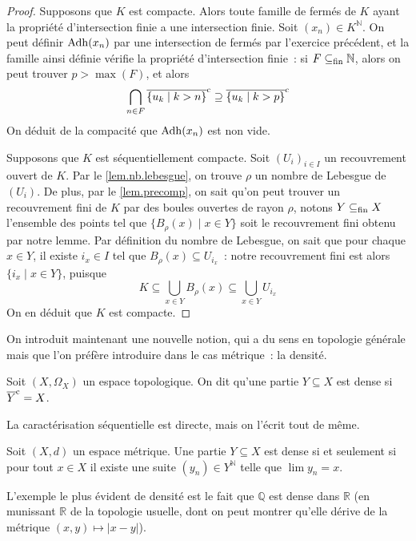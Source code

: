 \begin{proof}
  Supposons que $K$ est compacte. Alors toute famille de fermés de $K$ ayant
  la propriété d'intersection finie a une intersection finie. Soit
  $(x_n)\in K^{\mathbb N}$. On peut définir
  $\operatorname{Adh}(x_n)$ par une intersection de fermés par l'exercice précédent, et
  la famille ainsi définie vérifie la propriété d'intersection finie~: si
  $F\subseteq_{\mathrm{fin}} \mathbb N$, alors on peut trouver $p > \max(F)$, et alors
  \[\bigcap_{n \in F}\overline{\{u_k\mid k > n\}}^{\mathrm c} \supseteq
  \overline{\{u_k\mid k > p\}}^{\mathrm c}\]
  On déduit de la compacité que $\operatorname{Adh}(x_n)$ est non vide.
  
  Supposons que $K$ est séquentiellement compacte. Soit $(U_i)_{i\in I}$ un
  recouvrement ouvert de $K$. Par le \cref{lem.nb.lebesgue}, on trouve $\rho$ un
  nombre de Lebesgue de $(U_i)$. De plus, par le \cref{lem.precomp}, on sait
  qu'on peut trouver un recouvrement fini de $K$ par des boules ouvertes de
  rayon $\rho$, notons $Y \subseteq_{\mathrm{fin}} X$ l'ensemble des points tel que
  $\{B_\rho(x)\mid x \in Y\}$ soit le recouvrement fini obtenu par notre lemme.
  Par définition du nombre de Lebesgue, on sait que pour chaque $x \in Y$, il
  existe $i_x \in I$ tel que $B_\rho(x) \subseteq U_{i_x}$~: notre recouvrement
  fini est alors $\{i_x\mid x \in Y\}$, puisque
  \[K\subseteq \bigcup_{x \in Y} B_\rho(x) \subseteq \bigcup_{x \in Y} U_{i_x}\]
  On en déduit que $K$ est compacte.
\end{proof}

On introduit maintenant une nouvelle notion, qui a du sens en topologie générale
mais que l'on préfère introduire dans le cas métrique~: la densité.

\begin{definition}[Densité]
  Soit $(X,\Omega_X)$ un espace topologique. On dit qu'une partie
  $Y\subseteq X$ est dense si $\overline{Y}^{\mathrm c} = X$.
\end{definition}

La caractérisation séquentielle est directe, mais on l'écrit tout de même.

\begin{property}
  Soit $(X,d)$ un espace métrique. Une partie $Y\subseteq X$ est dense si et
  seulement si pour tout $x\in X$ il existe une suite $(y_n)\in Y^\mathbb N$
  telle que $\lim y_n = x$.
\end{property}

\begin{example}
  L'exemple le plus évident de densité est le fait que $\mathbb Q$ est dense
  dans $\mathbb R$ (en munissant $\mathbb R$ de la topologie usuelle, dont on
  peut montrer qu'elle dérive de la métrique $(x,y)\mapsto |x-y|$).
\end{example}

